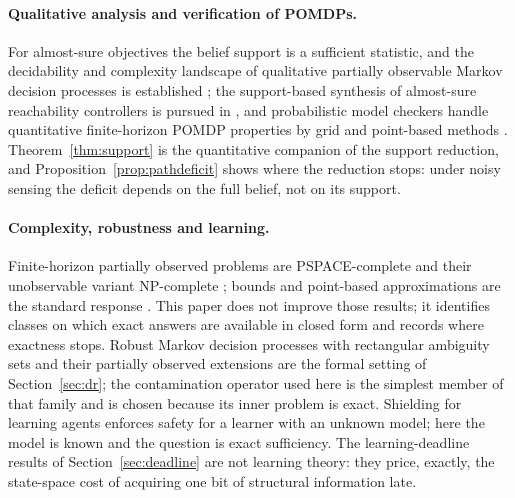 \documentclass[11pt,a4paper]{article}
\theoremstyle{plain}
\theoremstyle{definition}
\theoremstyle{remark}
\begin{document}
\paragraph{Qualitative analysis and verification of POMDPs.}
For almost-sure objectives the belief support is a sufficient statistic, and the decidability and complexity landscape of qualitative partially observable Markov decision processes is established \cite{Chatterjee2010,Chatterjee2016}; the support-based synthesis of almost-sure reachability controllers is pursued in \cite{Junges2021}, and probabilistic model checkers handle quantitative finite-horizon POMDP properties by grid and point-based methods \cite{Norman2017,Bouton2020}. Theorem~\ref{thm:support} is the quantitative companion of the support reduction, and Proposition~\ref{prop:pathdeficit} shows where the reduction stops: under noisy sensing the deficit depends on the full belief, not on its support.

\paragraph{Complexity, robustness and learning.}
Finite-horizon partially observed problems are PSPACE-complete and their unobservable variant NP-complete \cite{PapadimitriouTsitsiklis1987}; bounds and point-based approximations are the standard response \cite{Lovejoy1991,Pineau2003}. This paper does not improve those results; it identifies classes on which exact answers are available in closed form and records where exactness stops. Robust Markov decision processes with rectangular ambiguity sets \cite{Iyengar2005,NilimElGhaoui2005} and their partially observed extensions \cite{Osogami2015,Nakao2021,Saghafian2018} are the formal setting of Section~\ref{sec:dr}; the contamination operator used here is the simplest member of that family and is chosen because its inner problem is exact. Shielding for learning agents \cite{Alshiekh2018} enforces safety for a learner with an unknown model; here the model is known and the question is exact sufficiency. The learning-deadline results of Section~\ref{sec:deadline} are not learning theory: they price, exactly, the state-space cost of acquiring one bit of structural information late.
\end{document}
